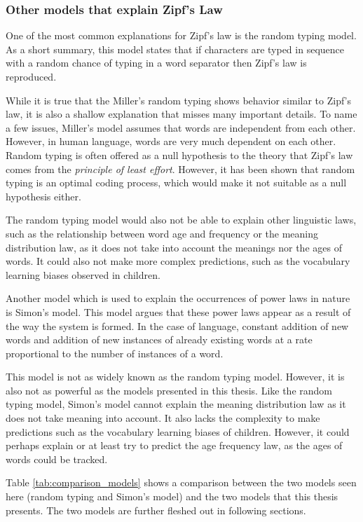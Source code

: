 \subsubsection{Other models that explain Zipf's Law}

One of the most common explanations for Zipf's law is the random typing model.\cite{Miller1963a}
As a short summary, this model states that if characters are typed in sequence with a random chance of typing in a word separator then Zipf's law is reproduced.

While it is true that the Miller's random typing shows behavior similar to Zipf's law, it is also a shallow explanation that misses many important details.
To name a few issues, Miller's model assumes that words are independent from each other.
However, in human language, words are very much dependent on each other.
Random typing is often offered as a null hypothesis to the theory that Zipf's law comes from the \emph{principle of least effort}.
However, it has been shown \cite{Ferrer2020a} that random typing is an optimal coding process, which would make it not suitable as a null hypothesis either.

The random typing model would also not be able to explain other linguistic laws, such as the relationship between word age and frequency or the meaning distribution law, as it does not take into account the meanings nor the ages of words.
It could also not make more complex predictions, such as the vocabulary learning biases observed in children.

Another model which is used to explain the occurrences of power laws in nature is Simon's model.\cite{Simon1955}
This model argues that these power laws appear as a result of the way the system is formed.
In the case of language, constant addition of new words and addition of new instances of already existing words at a rate proportional to the number of instances of a word.

This model is not as widely known as the random typing model.
However, it is also not as powerful as the models presented in this thesis.
Like the random typing model, Simon's model cannot explain the meaning distribution law as it does not take meaning into account.
It also lacks the complexity to make predictions such as the vocabulary learning biases of children.
However, it could perhaps explain or at least try to predict the age frequency law, as the ages of words could be tracked.

Table \ref{tab:comparison_models} shows a comparison between the two models seen here (random typing and Simon's model) and the two models that this thesis presents.
The two models are further fleshed out in following sections.

